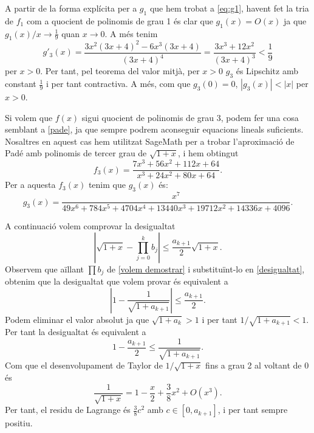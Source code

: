 \documentclass[12pt]{article}
\newcommand{\abs}[1]{\left\lvert#1\right\rvert}
\begin{document}
A partir de la forma explícita per a \( g_1 \) que hem trobat a \ref{eq:g1}, havent fet la tria de \( f_1 \) com a quocient de polinomis de grau 1 és clar que \( g_1(x) = O(x) \) ja que \( g_1(x) / x \to \frac{1}{9} \) quan \( x \to 0 \). A més tenim
\begin{equation*}
	g'_3(x) = \frac{3x^2(3x+4)^2 - 6x^3(3x+4)}{(3x+4)^4} = \frac{3x^3 + 12x^2}{(3x+4)^3} < \frac{1}{9}	
\end{equation*}
per \( x > 0 \). Per tant, pel teorema del valor mitjà, per \( x>0 \) \( g_3 \) és Lipschitz amb constant \( \frac{1}{9} \) i per tant contractiva. A més, com que \( g_3(0) = 0 \), \( \abs{g_3(x)} < \abs{x} \) per \( x > 0 \). 

Si volem que $f(x)$ sigui quocient de polinomis de grau 3, podem fer una cosa semblant a \eqref{pade}, ja que sempre podrem aconseguir equacions lineals suficients. Nosaltres en aquest cas hem utilitzat SageMath per a trobar l'aproximació de Padé amb polinomis de tercer grau de $\sqrt{1+x}$, i hem obtingut
\begin{equation*}
	f_3(x)=\dfrac{7x^3+56x^2+112x+64}{x^3+24x^2+80x+64}.
\end{equation*}
Per a aquesta $f_3(x)$ tenim que $g_3(x)$ és:
\begin{equation}\label{g3x}
	g_3(x)=\dfrac{x^7}{49x^6+784x^5+4704x^4+13440x^3+19712x^2+14336x+4096}.
\end{equation}

A continuació volem comprovar la desigualtat
\begin{equation}\label{desigualtat}
	\abs{\sqrt{1+x}-\prod_{j=0}^{k}b_j}\leq\frac{a_{k+1}}{2}\sqrt{1+x}.
\end{equation}
Observem que aïllant $\prod b_j$ de \eqref{volem demostrar} i substituïnt-lo en \eqref{desigualtat}, obtenim que la desigualtat que volem provar és equivalent a
\begin{equation}
	\left| 1-\dfrac{1}{\sqrt{1+a_{k+1}}}\right|\leq\dfrac{a_{k+1}}{2}.
\end{equation}
Podem eliminar el valor absolut ja que \( \sqrt{1 + a_k} > 1 \) i per tant $1/\sqrt{1+a_{k+1}}<1$. Per tant la desigualtat és equivalent a
\begin{equation}
	1-\dfrac{a_{k+1}}{2}\leq\dfrac{1}{\sqrt{1+a_{k+1}}}.
\end{equation}
Com que el desenvolupament de Taylor de $1/\sqrt{1+x}$ fins a grau 2 al voltant de 0 és
\begin{equation}
	\dfrac{1}{\sqrt{1+x}}=1-\dfrac{x}{2}+\frac{3}{8}x^2 + O(x^3).
\end{equation}
Per tant, el residu de Lagrange és \( \frac{3}{8}c^2 \) amb \( c \in [0, a_{k+1}] \), i per tant sempre positiu.
\end{document}
